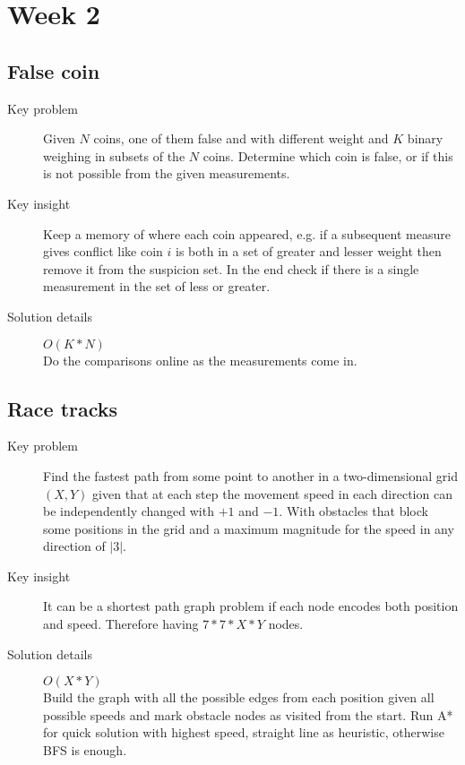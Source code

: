 \documentclass[11pt]{book}
\begin{document}
\section{Week 2}

\subsection{False coin}

\begin{description}
	\item[Key problem] Given $N$ coins, one of them false and with different weight and $K$ binary weighing in subsets of the $N$ coins. Determine which coin is false, or if this is not possible from the given measurements.
	\item[Key insight] Keep a memory of where each coin appeared, e.g. if a subsequent measure gives conflict like coin $i$ is both in a set of greater and lesser weight then remove it from the suspicion set. In the end check if there is a single measurement in the set of less or greater. 
	\item[Solution details] $O(K*N)$ \\ Do the comparisons online as the measurements come in.
\end{description}

\subsection{Race tracks}

\begin{description}
	\item[Key problem] Find the fastest path from some point to another in a two-dimensional grid $(X,Y)$ given that at each step the movement speed in each direction can be independently changed with $+1$ and $-1$. With obstacles that block some positions in the grid and a maximum magnitude for the speed in any direction of $|3|$.
	\item[Key insight] It can be a shortest path graph problem if each node encodes both position and speed. Therefore having $7*7*X*Y$ nodes.
	\item[Solution details] $O(X*Y)$ \\ Build the graph with all the possible edges from each position given all possible speeds and mark obstacle nodes as visited from the start. Run A* for quick solution with highest speed, straight line as heuristic, otherwise BFS is enough.
\end{description}
\end{document}

